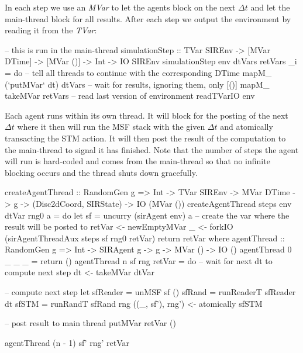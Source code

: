 In each step we use an \textit{MVar} to let the agents block on the next $\Delta t$ and let the main-thread block for all results. After each step we output the environment by reading it from the \textit{TVar}:
\begin{HaskellCode}
-- this is run in the main-thread
simulationStep :: TVar SIREnv
               -> [MVar DTime]
               -> [MVar ()]
               -> Int
               -> IO SIREnv
simulationStep env dtVars retVars _i = do
  -- tell all threads to continue with the corresponding DTime
  mapM_ (`putMVar` dt) dtVars
  -- wait for results, ignoring them, only [()]
  mapM_ takeMVar retVars
  -- read last version of environment
  readTVarIO env
\end{HaskellCode}

Each agent runs within its own thread. It will block for the posting of the next $\Delta t$ where it then will run the MSF stack with the given $\Delta t$ and atomically transacting the STM action. It will then post the result of the computation to the main-thread to signal it has finished. Note that the number of steps the agent will run is hard-coded and comes from the main-thread so that no infinite blocking occurs and the thread shuts down gracefully.

\begin{HaskellCode}
createAgentThread :: RandomGen g 
                  => Int 
                  -> TVar SIREnv
                  -> MVar DTime
                  -> g
                  -> (Disc2dCoord, SIRState)
                  -> IO (MVar ())
createAgentThread steps env dtVar rng0 a = do
    let sf = uncurry (sirAgent env) a
    -- create the var where the result will be posted to
    retVar <- newEmptyMVar
    _ <- forkIO (sirAgentThreadAux steps sf rng0 retVar)
    return retVar
  where
    agentThread :: RandomGen g 
                => Int
                -> SIRAgent g
                -> g
                -> MVar ()
                -> IO ()
    agentThread 0 _ _ _ = return ()
    agentThread n sf rng retVar = do
      -- wait for next dt to compute next step
      dt <- takeMVar dtVar

      -- compute next step
      let sfReader = unMSF sf ()
          sfRand   = runReaderT sfReader dt
          sfSTM    = runRandT sfRand rng
      ((_, sf'), rng') <- atomically sfSTM 
      
      -- post result to main thread
      putMVar retVar ()
      
      agentThread (n - 1) sf' rng' retVar
\end{HaskellCode}

